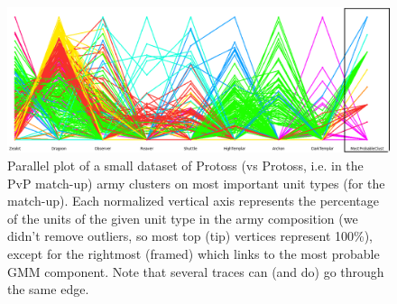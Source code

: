 \begin{figure}[htp]
\centerline{\includegraphics[width=1.0\columnwidth]{images/PvP_small.png}}
\caption{Parallel plot of a small dataset of Protoss (vs Protoss, i.e. in the PvP match-up) army clusters on most important unit types (for the match-up). Each normalized vertical axis represents the percentage of the units of the given unit type in the army composition (we didn't remove outliers, so most top (tip) vertices represent 100\%), except for the rightmost (framed) which links to the most probable GMM component. Note that several traces can (and do) go through the same edge.}
\label{parallelplot}
\end{figure}




